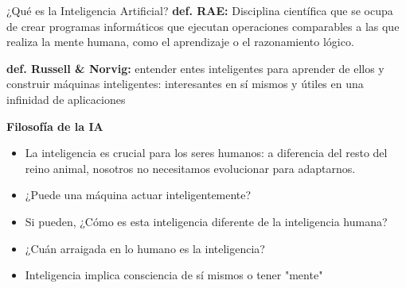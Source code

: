 \documentclass[9pt]{beamer}
\begin{document}
\begin{frame}{¿Qué es la Inteligencia Artificial?}
\textbf{def. RAE:} Disciplina científica que se ocupa de crear programas
informáticos que ejecutan operaciones comparables a las que realiza
la mente humana, como el aprendizaje o el razonamiento lógico.\\
\vspace{2em}

\textbf{def. Russell \& Norvig:} entender entes inteligentes para aprender
de ellos y construir máquinas inteligentes: interesantes en sí mismos
y útiles en una infinidad de aplicaciones
\vspace{2em}


\textbf{Filosofía de la IA}
\begin{itemize}
  \item La inteligencia es crucial para los seres humanos: a diferencia del resto del reino animal, nosotros no necesitamos evolucionar para adaptarnos.
  \item ¿Puede una máquina actuar inteligentemente?
  \item Si pueden, ¿Cómo es esta inteligencia diferente de la inteligencia humana?
  \item ¿Cuán arraigada en lo humano es la inteligencia?
  \item Inteligencia implica consciencia de sí mismos o tener "mente"
\end{itemize}

\end{frame}
\end{document}
